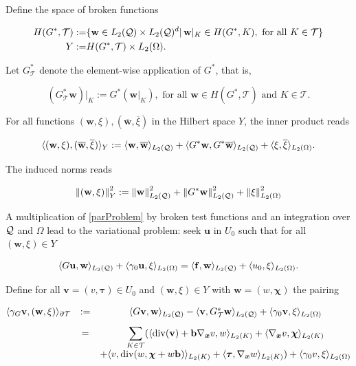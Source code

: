 Define the space of broken functions



\begin{align*}
    H(G^*,\mathcal{T}):=&\{\mathbf{w}\in L_2(\mathcal{Q})\times L_2(\mathcal{Q})^d|\, \mathbf{w}|_K\in H(G^*,K), \text{ for all }K\in\mathcal{T}\}\\
    Y:=&H(G^*,\mathcal{T})\times L_2(\Omega).
\end{align*}

Let $G^*_{\mathcal{T}}$ denote the element-wise application of $G^*$, that is, 

$$(G^*_{\mathcal{T}}\mathbf{w})|_K:=G^*(\mathbf{w}|_K), \text{ for all }\mathbf{w}\in H(G^*,\mathcal{T}) \text{ and }K\in\mathcal{T}.$$

For all functions $(\mathbf{w},\xi),(\overline{\mathbf{w}},\overline{\xi})$ in the Hilbert space $Y$, the inner product reads

\begin{equation}
    \langle (\mathbf{w},\xi) , (\overline{\mathbf{w}},\overline{\xi}) \rangle_Y:=\langle \mathbf{w} , \overline{\mathbf{w}} \rangle_{L_2(\mathcal{Q})}+\langle G^*\mathbf{w} , G^*\overline{\mathbf{w}} \rangle_{L_2(\mathcal{Q})}+\langle \xi , \overline{\xi} \rangle_{L_2(\Omega)}.
\end{equation}

The induced norms reads

$$\left\lVert(\mathbf{w},\xi) \right\rVert_Y^2:=\left\lVert\mathbf{w} \right\rVert_{L_2(\mathcal{Q})}^2+\left\lVert G^*\mathbf{w} \right\rVert_{L_2(\mathcal{Q})}^2+\left\lVert\xi \right\rVert_{L_2(\Omega)}^2$$

A multiplication of \eqref{parProblem} by broken test functions and an integration over $\mathcal{Q}$ and $\Omega$ lead to the variational problem: seek $\mathbf{u}$ in $U_0$ such that for all $(\mathbf{w},\xi)\in Y$

\begin{equation}\label{var1}
    \langle G\mathbf{u} , \mathbf{w} \rangle_{L_2(\mathcal{Q})}+\langle \gamma_0\mathbf{u} , \xi \rangle_{L_2(\Omega)}=\langle \mathbf{f} , \mathbf{w} \rangle_{L_2(\mathcal{Q})}+\langle u_0 , \xi \rangle_{L_2(\Omega)}.
\end{equation}

Define for all $\mathbf{v}=(v,\boldsymbol{\tau})\in U_0$ and $(\mathbf{w},\xi)\in Y$ with $\mathbf{w}=(w,\boldsymbol{\chi})$ the pairing

\begin{equation}\label{trace}
    \begin{matrix}
        \pp{\gamma_G\mathbf{v}}{(\mathbf{w},\xi)}_{\partial\mathcal{T}}&:=&\pp{G\mathbf{v}}{\mathbf{w}}_{L_2(\cyl)}-\pp{\mathbf{v}}{G^*_{\mathcal{T}}\mathbf{w}}_{L_2(\cyl)}+\pp{\gamma_0\mathbf{v}}{\xi}_{L_2(\Omega)}\vspace{0.3 cm}\\&=&\displaystyle\sum_{K\in\mathcal{T}}(\pp{\dv(\mathbf{v})+\mathbf{b}\nab v}{w}_{L_2(K)}+\pp{\nab v}{\boldsymbol{\chi}}_{L_2(K)}\\&&+\pp{v}{\dv(w,\boldsymbol{\chi}+w\mathbf{b})}_{L_2(K)}+\pp{\boldsymbol{\tau}}{\nab w}_{L_2(K)})+\pp{\gamma_0v}{\xi}_{L_2(\Omega)}
    \end{matrix}
\end{equation}

